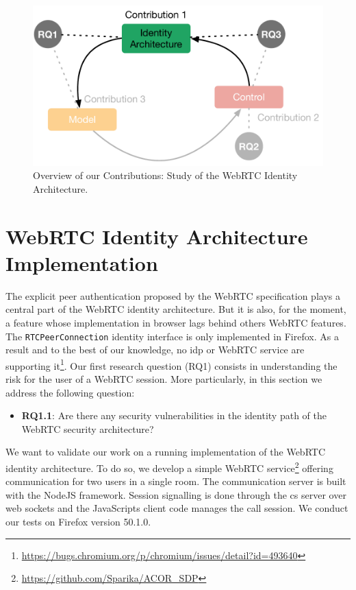 \begin{figure}[H]
\includegraphics[scale=.5]{images/contrib1}
\caption{Overview of our Contributions: Study of the WebRTC Identity Architecture.}
\label{contrib1}
\end{figure}


\glsresetall
\section{WebRTC Identity Architecture Implementation}
\label{idpproxyimplem}
The explicit peer authentication proposed by the WebRTC specification plays a central part of the WebRTC identity architecture.
But it is also, for the moment, a feature whose implementation in browser lags behind others WebRTC features.
The \texttt{RTCPeerConnection} identity interface is only implemented in Firefox.
As a result and to the best of our knowledge, no \gls{idp} or WebRTC service are supporting it\footnote{\url{https://bugs.chromium.org/p/chromium/issues/detail?id=493640}}.
Our first research question (RQ1) consists in understanding the risk for the user of a WebRTC session. 
More particularly, in this section we address the following question:
\begin{itemize}
\item \textbf{RQ1.1}: Are there any security vulnerabilities in the identity path of the WebRTC security architecture?
\end{itemize}
We want to validate our work on a running implementation of the WebRTC identity architecture.
To do so, we develop a simple WebRTC service\footnote{\url{https://github.com/Sparika/ACOR\_SDP}} offering communication for two users in a single room.
The communication server is built with the NodeJS framework.
Session signalling is done through the \gls{cs} server over web sockets and the JavaScripts client code manages the call session.
We conduct our tests on Firefox version 50.1.0. 

